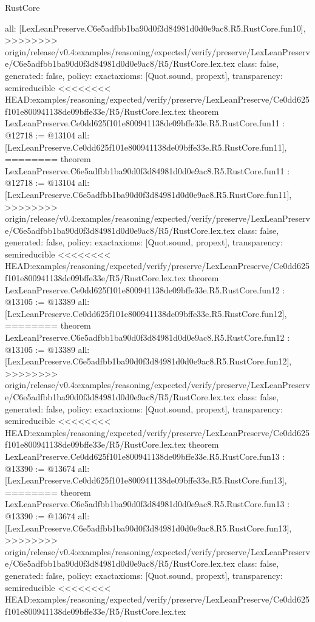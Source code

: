 \begin{lexlean}{RustCore}
\begin{coremodule}
{\begin{coremodule}
{{{{{{{{{{{{{{  all: [LexLeanPreserve.C6e5adfbb1ba90d0f3d84981d0d0e9ac8.R5.RustCore.fun10],
>>>>>>>> origin/release/v0.4:examples/reasoning/expected/verify/preserve/LexLeanPreserve/C6e5adfbb1ba90d0f3d84981d0d0e9ac8/R5/RustCore.lex.tex
  class: false,
  generated: false,
  policy: exact{axioms: [Quot.sound, propext]},
  transparency: semireducible
}
<<<<<<<< HEAD:examples/reasoning/expected/verify/preserve/LexLeanPreserve/Ce0dd625f101e800941138de09bffe33e/R5/RustCore.lex.tex
theorem LexLeanPreserve.Ce0dd625f101e800941138de09bffe33e.R5.RustCore.fun11 : @12718 := @13104 {
  all: [LexLeanPreserve.Ce0dd625f101e800941138de09bffe33e.R5.RustCore.fun11],
========
theorem LexLeanPreserve.C6e5adfbb1ba90d0f3d84981d0d0e9ac8.R5.RustCore.fun11 : @12718 := @13104 {
  all: [LexLeanPreserve.C6e5adfbb1ba90d0f3d84981d0d0e9ac8.R5.RustCore.fun11],
>>>>>>>> origin/release/v0.4:examples/reasoning/expected/verify/preserve/LexLeanPreserve/C6e5adfbb1ba90d0f3d84981d0d0e9ac8/R5/RustCore.lex.tex
  class: false,
  generated: false,
  policy: exact{axioms: [Quot.sound, propext]},
  transparency: semireducible
}
<<<<<<<< HEAD:examples/reasoning/expected/verify/preserve/LexLeanPreserve/Ce0dd625f101e800941138de09bffe33e/R5/RustCore.lex.tex
theorem LexLeanPreserve.Ce0dd625f101e800941138de09bffe33e.R5.RustCore.fun12 : @13105 := @13389 {
  all: [LexLeanPreserve.Ce0dd625f101e800941138de09bffe33e.R5.RustCore.fun12],
========
theorem LexLeanPreserve.C6e5adfbb1ba90d0f3d84981d0d0e9ac8.R5.RustCore.fun12 : @13105 := @13389 {
  all: [LexLeanPreserve.C6e5adfbb1ba90d0f3d84981d0d0e9ac8.R5.RustCore.fun12],
>>>>>>>> origin/release/v0.4:examples/reasoning/expected/verify/preserve/LexLeanPreserve/C6e5adfbb1ba90d0f3d84981d0d0e9ac8/R5/RustCore.lex.tex
  class: false,
  generated: false,
  policy: exact{axioms: [Quot.sound, propext]},
  transparency: semireducible
}
<<<<<<<< HEAD:examples/reasoning/expected/verify/preserve/LexLeanPreserve/Ce0dd625f101e800941138de09bffe33e/R5/RustCore.lex.tex
theorem LexLeanPreserve.Ce0dd625f101e800941138de09bffe33e.R5.RustCore.fun13 : @13390 := @13674 {
  all: [LexLeanPreserve.Ce0dd625f101e800941138de09bffe33e.R5.RustCore.fun13],
========
theorem LexLeanPreserve.C6e5adfbb1ba90d0f3d84981d0d0e9ac8.R5.RustCore.fun13 : @13390 := @13674 {
  all: [LexLeanPreserve.C6e5adfbb1ba90d0f3d84981d0d0e9ac8.R5.RustCore.fun13],
>>>>>>>> origin/release/v0.4:examples/reasoning/expected/verify/preserve/LexLeanPreserve/C6e5adfbb1ba90d0f3d84981d0d0e9ac8/R5/RustCore.lex.tex
  class: false,
  generated: false,
  policy: exact{axioms: [Quot.sound, propext]},
  transparency: semireducible
}
<<<<<<<< HEAD:examples/reasoning/expected/verify/preserve/LexLeanPreserve/Ce0dd625f101e800941138de09bffe33e/R5/RustCore.lex.tex
}}}}}}}}}}}}}}}}
\end{coremodule}}
\end{coremodule}
\end{lexlean}
